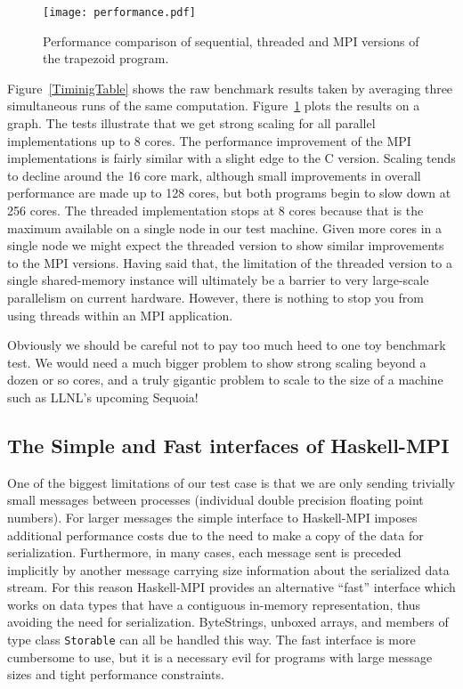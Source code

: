 \documentclass{tmr}
\begin{document}
\begin{figure}
\centering
\texttt{[image: performance.pdf]}
\vspace{3mm}
\caption{Performance comparison of sequential, threaded and MPI versions of the trapezoid program.
\label{PerformanceGraph}}
\end{figure}

Figure~\ref{TiminigTable} shows the raw benchmark results taken by averaging three
simultaneous runs of the same computation. Figure~\ref{PerformanceGraph}
plots the results on a graph. The tests illustrate that we get strong scaling
for all parallel implementations up to 8 cores. The performance improvement of
the MPI implementations is fairly similar with
a slight edge to the C version. Scaling tends to decline around
the 16 core mark, although small improvements in overall performance are made up to
128 cores, but both programs begin to slow down at 256 cores.
The threaded implementation stops at 8 cores because that is the maximum available
on a single node in our test machine.
Given more cores in a single node we might expect the threaded version to
show similar improvements to the MPI versions. Having said that, the limitation
of the threaded version to a single shared-memory instance will ultimately be
a barrier to very large-scale parallelism on current hardware.
However, there is nothing to stop you from using threads within an MPI application.

Obviously we should be careful not to pay too much heed to one toy benchmark test.
We would need a much bigger problem to show strong scaling beyond a dozen or so cores,
and a truly gigantic problem to scale to the size of a machine such as LLNL's
upcoming Sequoia!

\subsection{The Simple and Fast interfaces of Haskell-MPI}

One of the biggest limitations of our test case is that we are only sending trivially
small messages between processes (individual double precision floating point numbers).
For larger messages the simple interface to Haskell-MPI imposes additional
performance costs due to the need to make a copy of the data for serialization.
Furthermore, in many cases, each message sent is preceded implicitly by another
message carrying size information about the serialized data stream.
For this reason Haskell-MPI provides an alternative ``fast'' interface which works
on data types that have a contiguous in-memory representation, thus avoiding
the need for serialization. ByteStrings, unboxed arrays, and members of type class
\verb|Storable| can all be handled this way. The fast interface is more
cumbersome to use, but it is a necessary evil for programs with large message sizes
and tight performance constraints.
\end{document}
